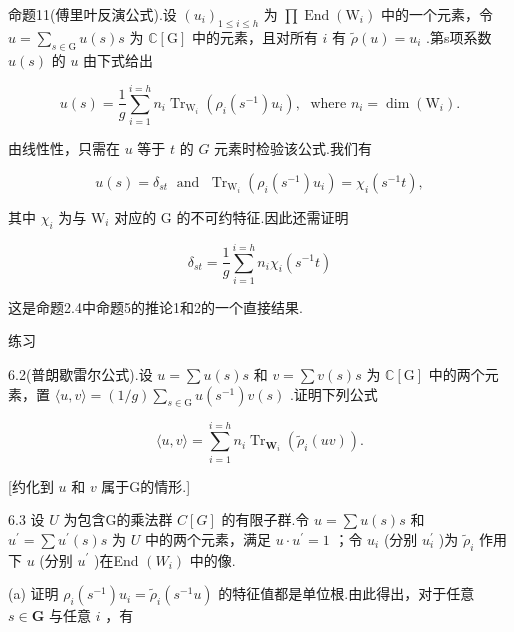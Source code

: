 \documentclass[10pt]{article}
\begin{document}
命题11(傅里叶反演公式).设 \({\left( {u}_{i}\right) }_{1 \leq  i \leq  h}\) 为 \(\prod \operatorname{End}\left( {\mathrm{W}}_{i}\right)\) 中的一个元素，令 \(u = \mathop{\sum }\limits_{{s \in  \mathrm{G}}}u\left( s\right) s\) 为 \(\mathbb{C}\left\lbrack  \mathrm{G}\right\rbrack\) 中的元素，且对所有 \(i\) 有 \(\widetilde{\rho }\left( u\right)  = {u}_{i}\) .第s项系数 \(u\left( s\right)\) 的 \(u\) 由下式给出

\[
u\left( s\right)  = \frac{1}{g}\mathop{\sum }\limits_{{i = 1}}^{{i = h}}{n}_{i}{\operatorname{Tr}}_{{\mathrm{W}}_{i}}\left( {{\rho }_{i}\left( {s}^{-1}\right) {u}_{i}}\right) ,\;\text{ where }{n}_{i} = \dim \left( {\mathrm{W}}_{i}\right) .
\]

由线性性，只需在 \(u\) 等于 \(t\) 的 \(G\) 元素时检验该公式.我们有

\[
u\left( s\right)  = {\delta }_{st}\;\text{ and }\;{\operatorname{Tr}}_{{\mathrm{W}}_{i}}\left( {{\rho }_{i}\left( {s}^{-1}\right) {u}_{i}}\right)  = {\chi }_{i}\left( {{s}^{-1}t}\right) ,
\]

其中 \({\chi }_{i}\) 为与 \({\mathrm{W}}_{i}\) 对应的 \(\mathrm{G}\) 的不可约特征.因此还需证明

\[
{\delta }_{st} = \frac{1}{g}\mathop{\sum }\limits_{{i = 1}}^{{i = h}}{n}_{i}{\chi }_{i}\left( {{s}^{-1}t}\right)
\]

这是命题2.4中命题5的推论1和2的一个直接结果.

练习

6.2(普朗歇雷尔公式).设 \(u = \sum u\left( s\right) s\) 和 \(v = \sum v\left( s\right) s\) 为 \(\mathbb{C}\left\lbrack  \mathrm{G}\right\rbrack\) 中的两个元素，置 \(\langle u,v\rangle  = \left( {1/g}\right) \mathop{\sum }\limits_{{s \in  \mathrm{G}}}u\left( {s}^{-1}\right) v\left( s\right)\) .证明下列公式

\[
\langle u,v\rangle  = \mathop{\sum }\limits_{{i = 1}}^{{i = h}}{n}_{i}{\operatorname{Tr}}_{{\mathbf{W}}_{i}}\left( {{\widetilde{\rho }}_{i}\left( {uv}\right) }\right) .
\]

[约化到 \(u\) 和 \(v\) 属于G的情形.]

6.3 设 \(U\) 为包含G的乘法群 \(C\left\lbrack  G\right\rbrack\) 的有限子群.令 \(u = \sum u\left( s\right) s\) 和 \({u}^{\prime } = \sum {u}^{\prime }\left( s\right) s\) 为 \(U\) 中的两个元素，满足 \(u \cdot  {u}^{\prime } = 1\) ；令 \({u}_{i}\) (分别 \({u}_{i}^{\prime }\) )为 \({\widetilde{\rho }}_{i}\) 作用下 \(u\) (分别 \({u}^{\prime }\) )在End \(\left( {W}_{i}\right)\) 中的像.

(a) 证明 \({\rho }_{i}\left( {s}^{-1}\right) {u}_{i} = {\widetilde{\rho }}_{i}\left( {{s}^{-1}u}\right)\) 的特征值都是单位根.由此得出，对于任意 \(s \in  \mathbf{G}\) 与任意 \(i\) ，有
\end{document}
